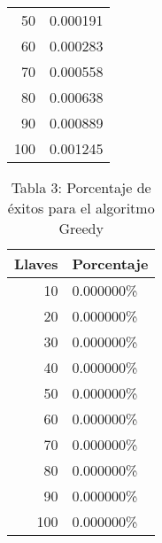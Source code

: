 \documentclass{article}
\begin{document}
\begin{center}
\begin{table}[ht]
\begin{tabular}{r|l}
50&0.000191\\
60&0.000283\\
70&0.000558\\
80&0.000638\\
90&0.000889\\
100&0.001245\\
\end{tabular}
\end{table}
\begin{table}[ht]
\centering
\caption*{Tabla 3: Porcentaje de \'exitos para el algoritmo Greedy}
\label{4}
\begin{tabular}{r|l}
Llaves & Porcentaje \\ \hline
10&0.000000\%\\
20&0.000000\%\\
30&0.000000\%\\
40&0.000000\%\\
50&0.000000\%\\
60&0.000000\%\\
70&0.000000\%\\
80&0.000000\%\\
90&0.000000\%\\
100&0.000000\%\\
\end{tabular}
\end{table}
\end{center}
\end{document}
